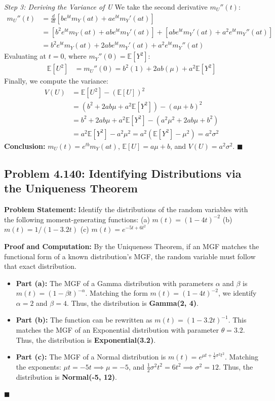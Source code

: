 \documentclass[11pt, a4paper]{article}
\theoremstyle{definition}
\theoremstyle{remark}
\newcommand{\E}{\mathbb{E}}
\begin{document}
\textit{Step 3: Deriving the Variance of U}
We take the second derivative $m_U''(t)$:
\begin{align*}
m_U''(t) &= \frac{d}{dt} \left[ b e^{bt} m_Y(at) + a e^{bt} m_Y'(at) \right] \\
&= \left[ b^2 e^{bt} m_Y(at) + ab e^{bt} m_Y'(at) \right] + \left[ ab e^{bt} m_Y'(at) + a^2 e^{bt} m_Y''(at) \right] \\
&= b^2 e^{bt} m_Y(at) + 2ab e^{bt} m_Y'(at) + a^2 e^{bt} m_Y''(at)
\end{align*}
Evaluating at $t=0$, where $m_Y''(0) = \E[Y^2]$:
\begin{align*}
\E[U^2] &= m_U''(0) = b^2(1) + 2ab(\mu) + a^2 \E[Y^2]
\end{align*}
Finally, we compute the variance:
\begin{align*}
V(U) &= \E[U^2] - (\E[U])^2 \\
&= \left( b^2 + 2ab\mu + a^2 \E[Y^2] \right) - (a\mu + b)^2 \\
&= b^2 + 2ab\mu + a^2 \E[Y^2] - (a^2\mu^2 + 2ab\mu + b^2) \\
&= a^2 \E[Y^2] - a^2\mu^2 = a^2(\E[Y^2] - \mu^2) = a^2 \sigma^2
\end{align*}
\textbf{Conclusion:} $m_U(t) = e^{tb} m_Y(at)$, $\E[U] = a\mu + b$, and $V(U) = a^2\sigma^2$. $\blacksquare$

\subsection{Problem 4.140: Identifying Distributions via the Uniqueness Theorem}
\textbf{Problem Statement:} Identify the distributions of the random variables with the following moment-generating functions:
(a) $m(t) = (1 - 4t)^{-2}$
(b) $m(t) = 1 / (1 - 3.2t)$
(c) $m(t) = e^{-5t + 6t^2}$

\textbf{Proof and Computation:}
By the Uniqueness Theorem, if an MGF matches the functional form of a known distribution's MGF, the random variable must follow that exact distribution.
\begin{itemize}
    \item \textbf{Part (a):} The MGF of a Gamma distribution with parameters $\alpha$ and $\beta$ is $m(t) = (1 - \beta t)^{-\alpha}$. Matching the form $m(t) = (1 - 4t)^{-2}$, we identify $\alpha = 2$ and $\beta = 4$. Thus, the distribution is \textbf{Gamma(2, 4)}.
    \item \textbf{Part (b):} The function can be rewritten as $m(t) = (1 - 3.2t)^{-1}$. This matches the MGF of an Exponential distribution with parameter $\theta = 3.2$. Thus, the distribution is \textbf{Exponential(3.2)}.
    \item \textbf{Part (c):} The MGF of a Normal distribution is $m(t) = e^{\mu t + \frac{1}{2}\sigma^2 t^2}$. Matching the exponents: $\mu t = -5t \implies \mu = -5$, and $\frac{1}{2}\sigma^2 t^2 = 6t^2 \implies \sigma^2 = 12$. Thus, the distribution is \textbf{Normal(-5, 12)}.
\end{itemize}
$\blacksquare$
\end{document}
